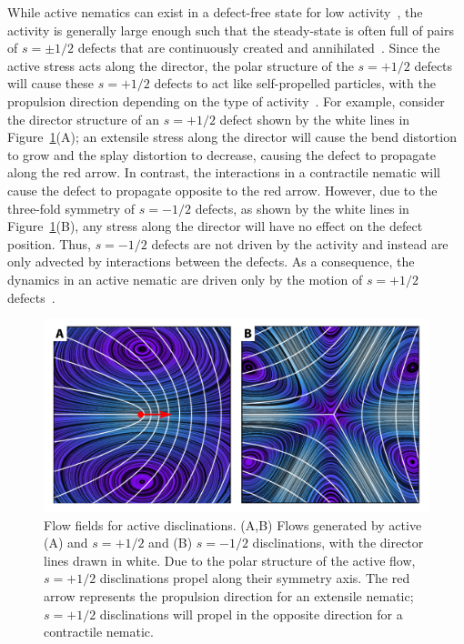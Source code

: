 While active nematics can exist in a defect-free state for low activity~\cite{RN247,RN7}, the activity is generally large enough such that the steady-state is often full of pairs of $s = \pm 1/2$ defects that are continuously created and annihilated~\cite{RN11,RN8,RN3,RN27,RN135,RN86}.
Since the active stress acts along the director, the polar structure of the $s = +1/2$ defects will cause these $s = +1/2$ defects to act like self-propelled particles, with the propulsion direction depending on the type of activity~\cite{RN11,RN8}.
For example, consider the director structure of an $s = +1/2$ defect shown by the white lines in Figure~\ref{f:3-DefectFlow}(A); an extensile stress along the director will cause the bend distortion to grow and the splay distortion to decrease, causing the defect to propagate along the red arrow.
In contrast, the interactions in a contractile nematic will cause the defect to propagate opposite to the red arrow.
However, due to the three-fold symmetry of $s = -1/2$ defects, as shown by the white lines in Figure~\ref{f:3-DefectFlow}(B), any stress along the director will have no effect on the defect position.
Thus, $s = -1/2$ defects are not driven by the activity and instead are only advected by interactions between the defects.
As a consequence, the dynamics in an active nematic are driven only by the motion of $s = +1/2$ defects~\cite{RN7}.
\begin{figure}
  \centering
  \includegraphics{figures/C3/Ch3-Figs_DefectFlow.png}
  \caption{Flow fields for active disclinations.
  (A,B) Flows generated by active (A) and $s=+1/2$ and (B) $s=-1/2$ disclinations, with the director lines drawn in white.
  Due to the polar structure of the active flow, $s = +1/2$ disclinations propel along their symmetry axis.
  The red arrow represents the propulsion direction for an extensile nematic; $s = +1/2$ disclinations will propel in the opposite direction for a contractile nematic.}\label{f:3-DefectFlow}
\end{figure}

